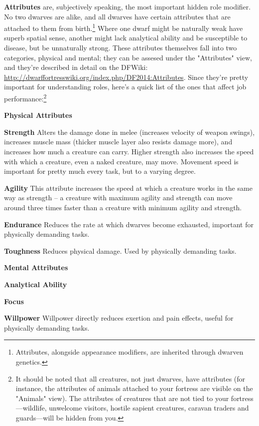 \documentclass[]{article}
\newcommand{\boldlist}[1] {
\vspace{12pt}
\noindent \textbf{#1}
}
\begin{document}
\textbf{Attributes} are, subjectively speaking, the most important hidden role modifier. No two
dwarves are alike, and all dwarves have certain attributes that are attached to them from
birth.\footnote{Attributes, alongside appearance modifiers, are inherited through dwarven genetics.}
Where one dwarf might be naturally weak have superb spatial sense, another might lack analytical
ability and be susceptible to disease, but be unnaturally strong. These attributes themselves fall into
two categories, physical and mental; they can be assesed under the "Attributes" view, and they're
described in detail on the DFWiki: \url{http://dwarffortresswiki.org/index.php/DF2014:Attributes}. Since
they're pretty important for understanding roles, here's a quick list of the ones that affect job
performance:\footnote{It should be noted that all creatures, not just dwarves, have attributes (for
instance, the attributes of animals attached to your fortress are visible on the "Animals" view). The
attributes of creatures that are not tied to your fortress---wildlife, unwelcome visitors, hostile
sapient creatures, caravan traders and guards---will be hidden from you.}

\boldlist{\indent Physical Attributes}

\boldlist{Strength} Alters the damage done in melee (increases velocity
of weapon swings), increases muscle mass (thicker muscle layer also resists damage more), and increases
how much a creature can carry. Higher strength also increases the speed with which a creature, even a
naked creature, may move. Movement speed is important for pretty much every task, but to a varying
degree.

\boldlist{Agility} This attribute increases the speed at which a creature works in the same way as
strength -- a creature with maximum agility and strength can move around three times faster than a
creature with minimum agility and strength.

\boldlist{Endurance} Reduces the rate at which dwarves become exhausted, important for physically
demanding tasks.

\boldlist{Toughness} Reduces physical damage. Used by physically demanding tasks.

\boldlist{\indent Mental Attributes}

\boldlist{Analytical Ability}

\boldlist{Focus}

\boldlist{Willpower} Willpower directly reduces exertion and pain effects, useful for physically
demanding tasks.
\end{document}
